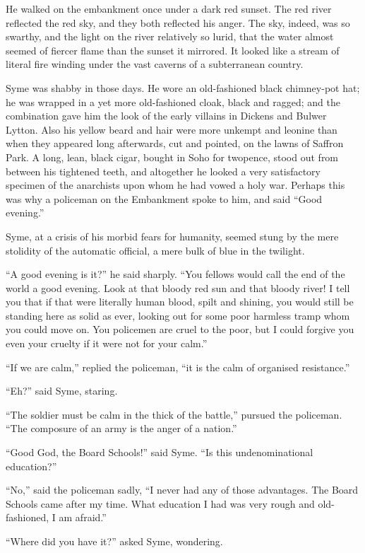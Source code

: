 \documentclass{book}
\begin{document}
He walked on the embankment once under a dark red sunset. The red river reflected the red sky, and they both reflected his anger. The sky, indeed, was so swarthy, and the light on the river relatively so lurid, that the water almost seemed of fiercer flame than the sunset it mirrored. It looked like a stream of literal fire winding under the vast caverns of a subterranean country.

Syme was shabby in those days. He wore an old-fashioned black chimney-pot hat; he was wrapped in a yet more old-fashioned cloak, black and ragged; and the combination gave him the look of the early villains in Dickens and Bulwer Lytton. Also his yellow beard and hair were more unkempt and leonine than when they appeared long afterwards, cut and pointed, on the lawns of Saffron Park. A long, lean, black cigar, bought in Soho for twopence, stood out from between his tightened teeth, and altogether he looked a very satisfactory specimen of the anarchists upon whom he had vowed a holy war. Perhaps this was why a policeman on the Embankment spoke to him, and said “Good evening.”

Syme, at a crisis of his morbid fears for humanity, seemed stung by the mere stolidity of the automatic official, a mere bulk of blue in the twilight.

“A good evening is it?” he said sharply. “You fellows would call the end of the world a good evening. Look at that bloody red sun and that bloody river! I tell you that if that were literally human blood, spilt and shining, you would still be standing here as solid as ever, looking out for some poor harmless tramp whom you could move on. You policemen are cruel to the poor, but I could forgive you even your cruelty if it were not for your calm.”

“If we are calm,” replied the policeman, “it is the calm of organised resistance.”

“Eh?” said Syme, staring.

“The soldier must be calm in the thick of the battle,” pursued the policeman. “The composure of an army is the anger of a nation.”

“Good God, the Board Schools!” said Syme. “Is this undenominational education?”

“No,” said the policeman sadly, “I never had any of those advantages. The Board Schools came after my time. What education I had was very rough and old-fashioned, I am afraid.”

“Where did you have it?” asked Syme, wondering.
\end{document}
